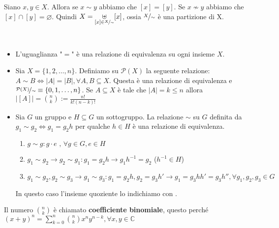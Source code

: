 \documentclass[../main.tex]{subfiles}
\begin{document}
\begin{definition}[Partizione]
    Siano $x,y \in X$. Allora se $x \sim y$ abbiamo che $[x] = [y]$. Se $x \nsim y$ abbiamo che $[x] \cap [y] = \varnothing$. Quindi $X = \underset{[x] \in \nicefrac{X}{\sim}}{\uplus} [x]$, ossia $\nicefrac{X}{\sim}$ è una partizione di X.
\end{definition}

\begin{example}
    \
    \begin{itemize}
        \item L'uguaglianza "$=$" è una relazione di equivalenza
              su ogni insieme $X$.
        \item Sia $X = \{1,2,\ldots,n\}$. Definiamo su $\mathcal{P}(X)$
              la seguente relazione:
              $A \sim B \iff |A| = |B|, \forall A,B \subseteq X$.
              Questa è una relazione di equivalenza e $\nicefrac{\mathcal{P}(X)}{\sim}
                  \equiv \{0,1,\ldots,n\}$. Se $A \subseteq X$ è tale che
              $|A| = k \leq n$ allora $|[A]| = \binom{n}{k} := \frac{n!}{k!(n-k)!}$
        \item Sia $G$ un gruppo e $H \subseteq G$ un sottogruppo. La relazione
              $\sim $ su $G$ definita da $g_1 \sim g_2 \iff g_1=g_2 h$
              per qualche $h \in H$ è una relazione di equivalenza.\
              \begin{enumerate}
                  \item $g \sim g : g \cdot e \text{ , } \forall g \in G , e \in H$
                  \item $g_1 \sim g_2 \rightarrow g_2 \sim g_1 : g_1 = g_2 h \rightarrow
                            g_1 h^{-1} = g_2$ ($h^{-1} \in H$)
                  \item $g_1 \sim g_2 , g_2 \sim g_3 \rightarrow g_1 \sim g_3 :
                            g_1 = g_2 h, g_2 = g_3 h' \rightarrow g_1 = g_3 h h' = g_3 h''
                            , \forall g_1,g_2,g_3 \in G$
              \end{enumerate}
              In questo caso l'insieme quoziente lo indichiamo con .

    \end{itemize}
\end{example}

\begin{definition}
    Il numero $\binom{n}{k}$ è chiamato \textbf{coefficiente binomiale}, questo perché $(x+y)^n = \sum_{k=0}^{n} \binom{n}{k} x^n y^{n-k}, \forall x,y \in \mathbb{C} $
\end{definition}
\end{document}
